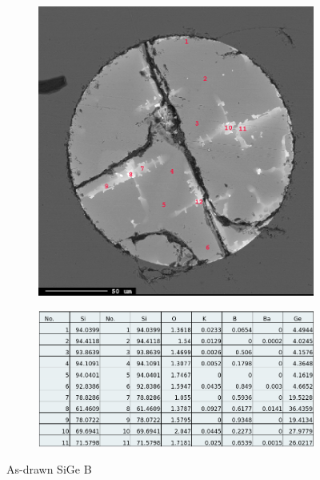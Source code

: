 \begin{figure}[h]
\centering
\begin{subfigure}{.6\textwidth}
  \centering
  \includegraphics[width=\linewidth]{fig/EDS/db30418_point.png}
  \label{fig:sfig1}
\end{subfigure}%

\begin{subfigure}{\textwidth}
  \centering
  \includegraphics[width=\linewidth]{fig/EDS/Screenshot from 2019-08-20 15-23-54.png}
  \label{fig:sfig2}
\end{subfigure}%
\caption{As-drawn SiGe B}
\label{sige_contrast}
\end{figure}


